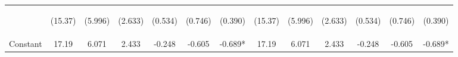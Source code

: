 \documentclass[]{article}
\begin{document}
\begin{center}
\begin{tabular}{lcccccccccccc}
\vspace{4pt} & \begin{footnotesize}(15.37)\end{footnotesize} & \begin{footnotesize}(5.996)\end{footnotesize} & \begin{footnotesize}(2.633)\end{footnotesize} & \begin{footnotesize}(0.534)\end{footnotesize} & \begin{footnotesize}(0.746)\end{footnotesize} & \begin{footnotesize}(0.390)\end{footnotesize} & \begin{footnotesize}(15.37)\end{footnotesize} & \begin{footnotesize}(5.996)\end{footnotesize} & \begin{footnotesize}(2.633)\end{footnotesize} & \begin{footnotesize}(0.534)\end{footnotesize} & \begin{footnotesize}(0.746)\end{footnotesize} & \begin{footnotesize}(0.390)\end{footnotesize} \\
Constant & 17.19 & 6.071 & 2.433 & -0.248 & -0.605 & -0.689* & 17.19 & 6.071 & 2.433 & -0.248 & -0.605 & -0.689* \\

\end{tabular}
\end{center}
\end{document}
